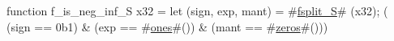 function f_is_neg_inf_S   x32 = {
  let (sign, exp, mant) = #\hyperref[sailRISCVzfsplitzyS]{fsplit\_S}# (x32);
  (  (sign == 0b1)
   & (exp  == #\hyperref[sailRISCVzones]{ones}#())
   & (mant == #\hyperref[sailRISCVzzzeros]{zeros}#()))
}
